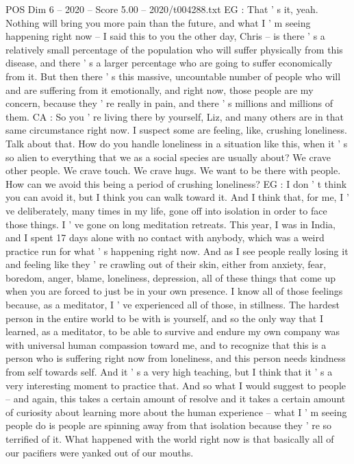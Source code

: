 \begin{textsample}{POS Dim 6 – 2020 – Score 5.00 – 2020/t004288.txt}
EG : That ' s it, yeah.
Nothing will bring you more pain than the future, and what I ' m seeing happening right now -- I said this to you the other day, Chris -- is there ' s a relatively small percentage of the population who will suffer physically from this disease, and there ' s a larger percentage who are going to suffer economically from it.
But then there ' s this massive, uncountable number of people who will and are suffering from it emotionally, and right now, those people are my concern, because they ' re really in pain, and there ' s millions and millions of them.
CA : So you ' re living there by yourself, Liz, and many others are in that same circumstance right now.
I suspect some are feeling, like, crushing loneliness.
Talk about that.
How do you handle loneliness in a situation like this, when it ' s so alien to everything that we as a social species are usually about?
We crave other people.
We crave touch.
We crave hugs.
We want to be there with people.
How can we avoid this being a period of crushing loneliness?
EG : I don ' t think you can avoid it, but I think you can walk toward it.
And I think that, for me, I ' ve deliberately, many times in my life, gone off into isolation in order to face those things.
I ' ve gone on long meditation retreats.
This year, I was in India, and I spent 17 days alone with no contact with anybody, which was a weird practice run for what ' s happening right now.
And as I see people really losing it and feeling like they ' re crawling out of their skin, either from anxiety, fear, boredom, anger, blame, loneliness, depression, all of these things that come up when you are forced to just be in your own presence.
I know all of those feelings because, as a meditator, I ' ve experienced all of those, in stillness.
The hardest person in the entire world to be with is yourself, and so the only way that I learned, as a meditator, to be able to survive and endure my own company was with universal human compassion toward me, and to recognize that this is a person who is suffering right now from loneliness, and this person needs kindness from self towards self.
And it ' s a very high teaching, but I think that it ' s a very interesting moment to practice that.
And so what I would suggest to people -- and again, this takes a certain amount of resolve and it takes a certain amount of curiosity about learning more about the human experience -- what I ' m seeing people do is people are spinning away from that isolation because they ' re so terrified of it.
What happened with the world right now is that basically all of our pacifiers were yanked out of our mouths.

\end{textsample}
